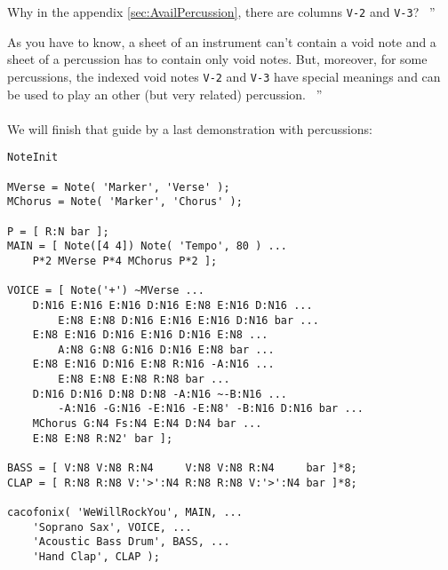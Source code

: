 \documentclass{article}
\newenvironment{meenv}{ \par \noindent \makebox[6em][r]{ \textcolor{mecolor}{Me}: `` --~}}{~''}
\newenvironment{myselfenv}{ \par \noindent \makebox[6em][r]{ \textcolor{myselfcolor}{Myself}: `` --~}}{~''}
\begin{document}
\begin{meenv}%
	Why in the appendix \ref{sec:AvailPercussion}, there are columns \lstinline!V-2! and \lstinline!V-3!?%
\end{meenv}
\begin{myselfenv}%
	As you have to know, a sheet of an instrument can't contain a void note and a sheet of a percussion has to contain only void notes. But, moreover, for some percussions, the indexed void notes \lstinline!V-2! and \lstinline!V-3! have special meanings and can be used to play an other (but very related) percussion.%
\end{myselfenv}

\paragraph{}

We will finish that guide by a last demonstration with percussions:


\begin{lstlisting}
NoteInit

MVerse = Note( 'Marker', 'Verse' );
MChorus = Note( 'Marker', 'Chorus' );

P = [ R:N bar ];
MAIN = [ Note([4 4]) Note( 'Tempo', 80 ) ...
	P*2 MVerse P*4 MChorus P*2 ];

VOICE = [ Note('+') ~MVerse ...
	D:N16 E:N16 E:N16 D:N16 E:N8 E:N16 D:N16 ...
		E:N8 E:N8 D:N16 E:N16 E:N16 D:N16 bar ...
	E:N8 E:N16 D:N16 E:N16 D:N16 E:N8 ...
		A:N8 G:N8 G:N16 D:N16 E:N8 bar ...
	E:N8 E:N16 D:N16 E:N8 R:N16 -A:N16 ...
		E:N8 E:N8 E:N8 R:N8 bar ...
	D:N16 D:N16 D:N8 D:N8 -A:N16 ~-B:N16 ...
		-A:N16 -G:N16 -E:N16 -E:N8' -B:N16 D:N16 bar ...
	MChorus G:N4 Fs:N4 E:N4 D:N4 bar ...
	E:N8 E:N8 R:N2' bar ];

BASS = [ V:N8 V:N8 R:N4     V:N8 V:N8 R:N4     bar ]*8;
CLAP = [ R:N8 R:N8 V:'>':N4 R:N8 R:N8 V:'>':N4 bar ]*8;

cacofonix( 'WeWillRockYou', MAIN, ...
	'Soprano Sax', VOICE, ...
	'Acoustic Bass Drum', BASS, ...
	'Hand Clap', CLAP );
\end{lstlisting}
\end{document}
